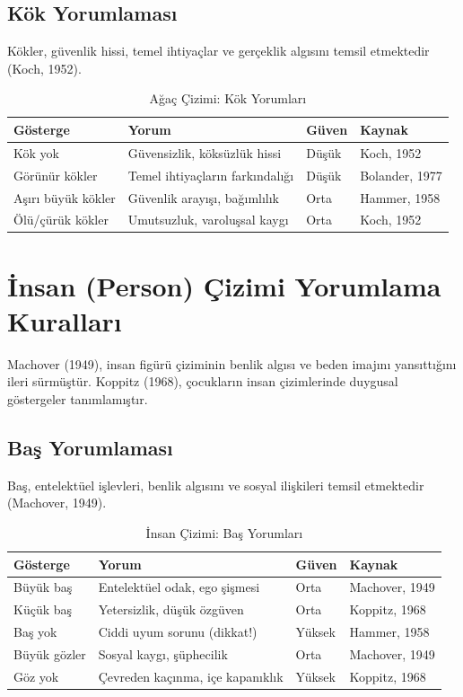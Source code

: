 \subsection{Kök Yorumlaması}

Kökler, güvenlik hissi, temel ihtiyaçlar ve gerçeklik algısını temsil etmektedir (Koch, 1952).

\begin{table}[H]
\centering
\caption{Ağaç Çizimi: Kök Yorumları}
\label{tab:agackok}
\begin{tabular}{p{3.5cm}p{5.5cm}p{2cm}p{2cm}}
\toprule
\textbf{Gösterge} & \textbf{Yorum} & \textbf{Güven} & \textbf{Kaynak} \\
\midrule
Kök yok & Güvensizlik, köksüzlük hissi & Düşük & Koch, 1952 \\
Görünür kökler & Temel ihtiyaçların farkındalığı & Düşük & Bolander, 1977 \\
Aşırı büyük kökler & Güvenlik arayışı, bağımlılık & Orta & Hammer, 1958 \\
Ölü/çürük kökler & Umutsuzluk, varoluşsal kaygı & Orta & Koch, 1952 \\
\bottomrule
\end{tabular}
\end{table}

\section{İnsan (Person) Çizimi Yorumlama Kuralları}

Machover (1949), insan figürü çiziminin benlik algısı ve beden imajını yansıttığını ileri sürmüştür. Koppitz (1968), çocukların insan çizimlerinde duygusal göstergeler tanımlamıştır.

\subsection{Baş Yorumlaması}

Baş, entelektüel işlevleri, benlik algısını ve sosyal ilişkileri temsil etmektedir (Machover, 1949).

\begin{table}[H]
\centering
\caption{İnsan Çizimi: Baş Yorumları}
\label{tab:insanbas}
\begin{tabular}{p{3.5cm}p{5.5cm}p{2cm}p{2cm}}
\toprule
\textbf{Gösterge} & \textbf{Yorum} & \textbf{Güven} & \textbf{Kaynak} \\
\midrule
Büyük baş & Entelektüel odak, ego şişmesi & Orta & Machover, 1949 \\
Küçük baş & Yetersizlik, düşük özgüven & Orta & Koppitz, 1968 \\
Baş yok & Ciddi uyum sorunu (dikkat!) & Yüksek & Hammer, 1958 \\
Büyük gözler & Sosyal kaygı, şüphecilik & Orta & Machover, 1949 \\
Göz yok & Çevreden kaçınma, içe kapanıklık & Yüksek & Koppitz, 1968 \\
\bottomrule
\end{tabular}
\end{table}

